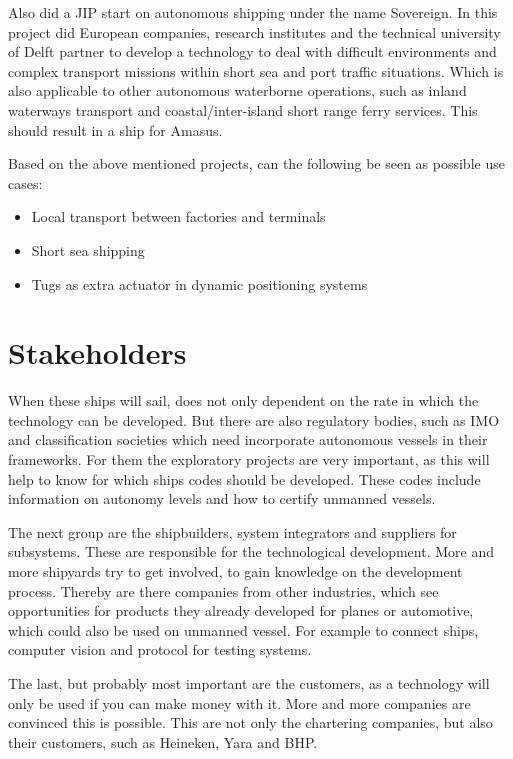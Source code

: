Also did a \acf{JIP} start on autonomous shipping under the name Sovereign. In this project did European companies, research institutes and the technical university of Delft partner to develop a technology to deal with difficult environments and complex transport missions within short sea and port traffic situations. Which is also applicable to other autonomous waterborne operations, such as inland waterways transport and coastal/inter-island short range ferry services. This should result in a ship for Amasus.  

Based on the above mentioned projects, can the following be seen as possible use cases:
\begin{itemize}
	\item Local transport between factories and terminals
	\item Short sea shipping
	\item Tugs as extra actuator in dynamic positioning systems
\end{itemize}

\section{Stakeholders}
When these ships will sail, does not only dependent on the rate in which the technology can be developed. But there are also regulatory bodies, such as \ac{IMO} and classification societies which need incorporate autonomous vessels in their frameworks. 
For them the exploratory projects are very important, as this will help to know for which ships codes should be developed. These codes include information on autonomy levels and how to certify unmanned vessels.

The next group are the shipbuilders, system integrators and suppliers for subsystems. These are responsible for the technological development. More and more shipyards try to get involved, to gain knowledge on the development process. 
Thereby are there companies from other industries, which see opportunities for products they already developed for planes or automotive, which could also be used on unmanned vessel. For example to connect ships, computer vision and protocol for testing systems.

The last, but probably most important are the customers, as a technology will only be used if you can make money with it. More and more companies are convinced this is possible. This are not only the chartering companies, but also their customers, such as Heineken, Yara and BHP.

